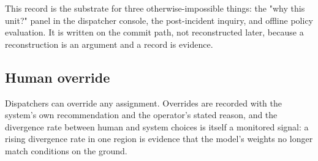 \begin{keybox}
This record is the substrate for three otherwise-impossible things: the
"why this unit?" panel in the dispatcher console, the post-incident inquiry,
and offline policy evaluation. It is written on the commit path, not
reconstructed later, because a reconstruction is an argument and a record is
evidence.
\end{keybox}

\subsection{Human override}

Dispatchers can override any assignment. Overrides are recorded with the
system's own recommendation and the operator's stated reason, and the
divergence rate between human and system choices is itself a monitored signal:
a rising divergence rate in one region is evidence that the model's weights no
longer match conditions on the ground.
